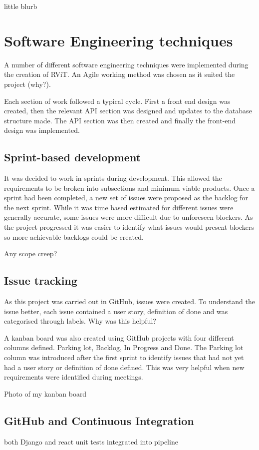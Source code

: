 \documentclass[l4proj.tex]{subfiles}
\begin{document}
    

little blurb 
\section{Software Engineering techniques}
A number of different software engineering techniques were implemented during the creation of RViT. An Agile working method was chosen as it suited the project (why?).

Each section of work followed a typical cycle. First a front end design was created, then the relevant API section was designed and updates to the database structure made. The API section was then created and finally the front-end design was implemented. 

\subsection{Sprint-based development}
It was decided to work in sprints during development. This allowed the requirements to be broken into subsections and minimum viable products. Once a sprint had been completed, a new set of issues were proposed as the backlog for the next sprint. While it was time based estimated for different issues were generally accurate, some issues were more difficult due to unforeseen blockers. As the project progressed it was easier to identify what issues would present blockers so more achievable backlogs could be created. 

Any scope creep?

\subsection{Issue tracking}
As this project was carried out in GitHub, issues were created. To understand the issue better, each issue contained a user story, definition of done and was categorised through labels. Why was this helpful?

A kanban board was also created using GitHub projects with four different columns defined. Parking lot, Backlog, In Progress and Done. The Parking lot column was introduced after the first sprint to identify issues that had not yet had a user story or definition of done defined. This was very helpful when new requirements were identified during meetings.

Photo of my kanban board

\subsection{GitHub and Continuous Integration}
both Django and react unit tests integrated into pipeline
\end{document}
